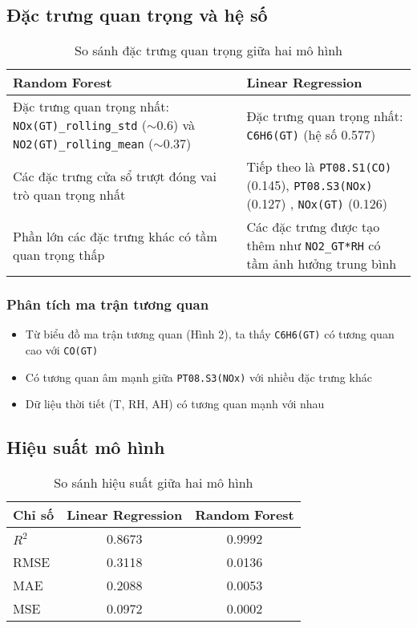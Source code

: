 \subsection{Đặc trưng quan trọng và hệ số}

\begin{table}[H]
\centering
\caption{So sánh đặc trưng quan trọng giữa hai mô hình}
\begin{tabular}{>{\raggedright\arraybackslash}p{7cm}|>{\raggedright\arraybackslash}p{7cm}}
\toprule
\textbf{Random Forest} & \textbf{Linear Regression} \\
\midrule
Đặc trưng quan trọng nhất: \texttt{NOx(GT)\_rolling\_std} ($\sim$0.6) và \texttt{NO2(GT)\_rolling\_mean} ($\sim$0.37) & Đặc trưng quan trọng nhất: \texttt{C6H6(GT)} (hệ số 0.577) \\
\midrule
Các đặc trưng cửa sổ trượt đóng vai trò quan trọng nhất & Tiếp theo là \texttt{PT08.S1(CO)} (0.145), \texttt{PT08.S3(NOx)} (0.127) ,  \texttt{NOx(GT)} (0.126) \\
\midrule
Phần lớn các đặc trưng khác có tầm quan trọng thấp & Các đặc trưng được tạo thêm như \texttt{NO2\_GT*RH} có tầm ảnh hưởng trung bình \\
\bottomrule
\end{tabular}
\end{table}

\subsubsection{Phân tích ma trận tương quan}
\begin{itemize}
  \item Từ biểu đồ ma trận tương quan (Hình 2), ta thấy \texttt{C6H6(GT)} có tương quan cao với \texttt{CO(GT)}
  \item Có tương quan âm mạnh giữa \texttt{PT08.S3(NOx)} với nhiều đặc trưng khác
  \item Dữ liệu thời tiết (T, RH, AH) có tương quan mạnh với nhau
\end{itemize}

\subsection{Hiệu suất mô hình}

\begin{table}[H]
\centering
\caption{So sánh hiệu suất giữa hai mô hình}
\begin{tabular}{l|c|c}
\toprule
\textbf{Chỉ số} & \textbf{Linear Regression} & \textbf{Random Forest} \\
\midrule
$R^2$ & 0.8673 & 0.9992 \\
\midrule
RMSE & 0.3118 & 0.0136 \\
\midrule
MAE & 0.2088 & 0.0053 \\
\midrule
MSE & 0.0972 &  0.0002\\
\bottomrule
\end{tabular}
\end{table}

